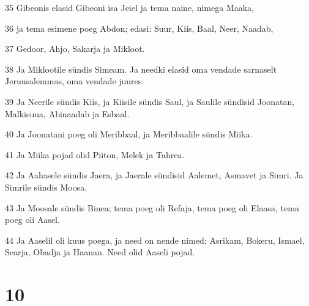 \par 35 Gibeonis elasid Gibeoni isa Jeiel ja tema naine, nimega Maaka,
\par 36 ja tema esimene poeg Abdon; edasi: Suur, Kiis, Baal, Neer, Naadab,
\par 37 Gedoor, Ahjo, Sakarja ja Mikloot.
\par 38 Ja Miklootile sündis Simeam. Ja needki elasid oma vendade sarnaselt Jeruusalemmas, oma vendade juures.
\par 39 Ja Neerile sündis Kiis, ja Kiisile sündis Saul, ja Saulile sündisid Joonatan, Malkisuua, Abinaadab ja Esbaal.
\par 40 Ja Joonatani poeg oli Meribbaal, ja Meribbaalile sündis Miika.
\par 41 Ja Miika pojad olid Piiton, Melek ja Tahrea.
\par 42 Ja Aahasele sündis Jaera, ja Jaerale sündisid Aalemet, Asmavet ja Simri. Ja Simrile sündis Moosa.
\par 43 Ja Moosale sündis Binea; tema poeg oli Refaja, tema poeg oli Elaasa, tema poeg oli Aasel.
\par 44 Ja Aaselil oli kuus poega, ja need on nende nimed: Asrikam, Bokeru, Ismael, Searja, Obadja ja Haanan. Need olid Aaseli pojad.

\chapter{10}


